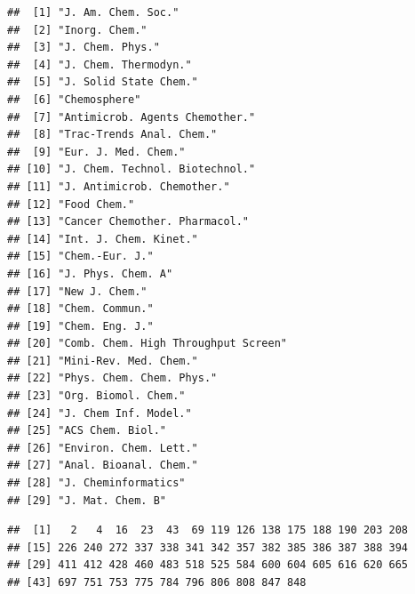 \documentclass[
]{book}
\newenvironment{Shaded}{\begin{snugshade}}{\end{snugshade}}
\newcommand{\CommentTok}[1]{\textcolor[rgb]{0.56,0.35,0.01}{\textit{#1}}}
\newcommand{\DecValTok}[1]{\textcolor[rgb]{0.00,0.00,0.81}{#1}}
\newcommand{\FunctionTok}[1]{\textcolor[rgb]{0.13,0.29,0.53}{\textbf{#1}}}
\newcommand{\NormalTok}[1]{#1}
\newcommand{\OtherTok}[1]{\textcolor[rgb]{0.56,0.35,0.01}{#1}}
\newcommand{\SpecialCharTok}[1]{\textcolor[rgb]{0.81,0.36,0.00}{\textbf{#1}}}
\begin{document}
\begin{verbatim}
##  [1] "J. Am. Chem. Soc."                 
##  [2] "Inorg. Chem."                      
##  [3] "J. Chem. Phys."                    
##  [4] "J. Chem. Thermodyn."               
##  [5] "J. Solid State Chem."              
##  [6] "Chemosphere"                       
##  [7] "Antimicrob. Agents Chemother."     
##  [8] "Trac-Trends Anal. Chem."           
##  [9] "Eur. J. Med. Chem."                
## [10] "J. Chem. Technol. Biotechnol."     
## [11] "J. Antimicrob. Chemother."         
## [12] "Food Chem."                        
## [13] "Cancer Chemother. Pharmacol."      
## [14] "Int. J. Chem. Kinet."              
## [15] "Chem.-Eur. J."                     
## [16] "J. Phys. Chem. A"                  
## [17] "New J. Chem."                      
## [18] "Chem. Commun."                     
## [19] "Chem. Eng. J."                     
## [20] "Comb. Chem. High Throughput Screen"
## [21] "Mini-Rev. Med. Chem."              
## [22] "Phys. Chem. Chem. Phys."           
## [23] "Org. Biomol. Chem."                
## [24] "J. Chem Inf. Model."               
## [25] "ACS Chem. Biol."                   
## [26] "Environ. Chem. Lett."              
## [27] "Anal. Bioanal. Chem."              
## [28] "J. Cheminformatics"                
## [29] "J. Mat. Chem. B"
\end{verbatim}

\begin{Shaded}
\end{Shaded}

\begin{verbatim}
##  [1]   2   4  16  23  43  69 119 126 138 175 188 190 203 208
## [15] 226 240 272 337 338 341 342 357 382 385 386 387 388 394
## [29] 411 412 428 460 483 518 525 584 600 604 605 616 620 665
## [43] 697 751 753 775 784 796 806 808 847 848
\end{verbatim}

\begin{Shaded}
\end{Shaded}
\end{document}
